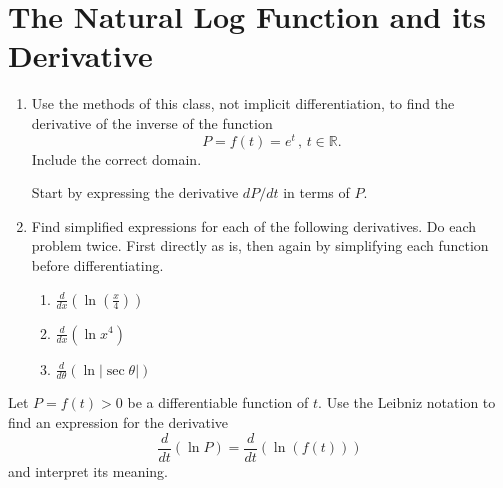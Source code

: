 \documentclass{ximera}
\begin{document}
\section{The Natural Log Function and its Derivative}

\begin{question} \label{Qf0e0feef0}
\begin{enumerate}
\item Use the methods of this class, not implicit differentiation, to find the derivative of the inverse of the function
\[
     P = f(t) = e^t \, ,\, t\in \mathbb{R}.
\]
Include the correct domain.

Start by expressing the derivative $dP/dt$ in terms of $P$.

\item Find simplified expressions for each of the following derivatives. Do each problem twice. First directly as is, then again by simplifying each function before differentiating.

\begin{enumerate}
\item $\frac{d}{dx} \left( \ln \left( \frac{x}{4} \right) \right)$

\item $\frac{d}{dx} \left( \ln x^4 \right)$

\item $\frac{d}{d\theta} \left(\ln \left| \sec\theta \right|  \right)$
\end{enumerate}
\end{enumerate}
\end{question}


\begin{question} \label{Qp0v3f30}
Let  $P=f(t)>0$ be a differentiable function of $t$.  Use the Leibniz notation to find an expression for the derivative
\[
         \frac{d}{dt} \left( \ln P \right) =   \frac{d}{dt} \left( \ln (f(t)) \right) 
\]
and interpret its meaning. 
\end{question}
\end{document}
